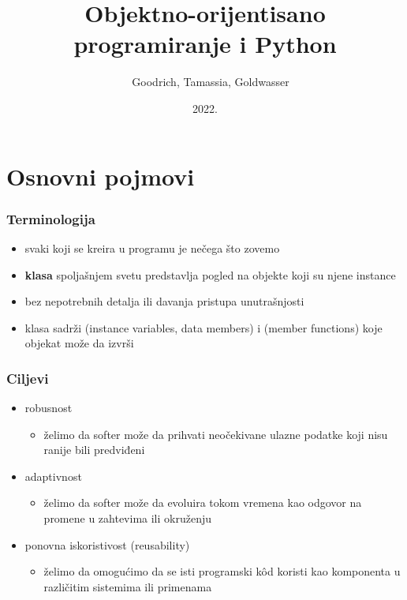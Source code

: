 \documentclass[compress,aspectratio=169]{beamer}
\title{Objektno-orijentisano programiranje i Python}
\author{\textcopyright \ \ Goodrich, Tamassia, Goldwasser}
\institute{Katedra za informatiku, Fakultet tehničkih nauka, Univerzitet u
Novom Sadu}
\date{2022.}
\begin{document}
\frame{\titlepage}

\section[Osnovni pojmovi]{Osnovni pojmovi}
\begin{frame}[fragile]
  \frametitle{Terminologija}
  \begin{itemize}
    \item svaki  koji se kreira u programu je  nečega što zovemo 
    \item \textbf{klasa} spoljašnjem svetu predstavlja pogled na objekte koji su njene instance
    \item bez nepotrebnih detalja ili davanja pristupa unutrašnjosti
    \item klasa sadrži  (instance variables, data members) i  (member functions) koje objekat može da izvrši 
  \end{itemize}
\end{frame}

\begin{frame}[fragile]
  \frametitle{Ciljevi}
  \begin{itemize}
    \item robusnost
    \begin{itemize}
      \item želimo da softer može da prihvati neočekivane ulazne podatke koji nisu ranije bili predviđeni
    \end{itemize}
    \item adaptivnost
    \begin{itemize}
      \item želimo da softer može da evoluira tokom vremena kao odgovor na promene u zahtevima ili okruženju
    \end{itemize}
    \item ponovna iskoristivost (reusability)
    \begin{itemize}
      \item želimo da omogućimo da se isti programski kôd koristi kao komponenta u različitim sistemima ili primenama
    \end{itemize}
  \end{itemize}
\end{frame}
\end{document}
